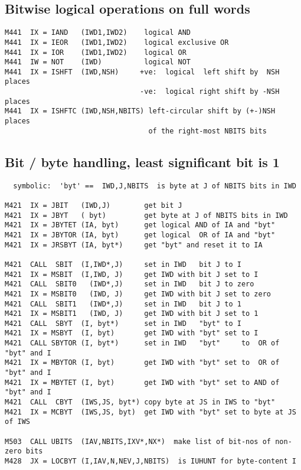 \subsection*{Bitwise logical operations on full words}

\begin{verbatim}
M441  IX = IAND   (IWD1,IWD2)    logical AND
M441  IX = IEOR   (IWD1,IWD2)    logical exclusive OR
M441  IX = IOR    (IWD1,IWD2)    logical OR
M441  IW = NOT    (IWD)          logical NOT
M441  IX = ISHFT  (IWD,NSH)     +ve:  logical  left shift by  NSH places
                                -ve:  logical right shift by -NSH places
M441  IX = ISHFTC (IWD,NSH,NBITS) left-circular shift by (+-)NSH places
                                  of the right-most NBITS bits
\end{verbatim}

\subsection*{Bit / byte handling, least significant bit is 1}

\begin{verbatim}
  symbolic:  'byt' ==  IWD,J,NBITS  is byte at J of NBITS bits in IWD

M421  IX = JBIT   (IWD,J)        get bit J
M421  IX = JBYT   ( byt)         get byte at J of NBITS bits in IWD
M421  IX = JBYTET (IA, byt)      get logical AND of IA and "byt"
M421  IX = JBYTOR (IA, byt)      get logical  OR of IA and "byt"
M421  IX = JRSBYT (IA, byt*)     get "byt" and reset it to IA

M421  CALL  SBIT  (I,IWD*,J)     set in IWD   bit J to I
M421  IX = MSBIT  (I,IWD, J)     get IWD with bit J set to I
M421  CALL  SBIT0   (IWD*,J)     set in IWD   bit J to zero
M421  IX = MSBIT0   (IWD, J)     get IWD with bit J set to zero
M421  CALL  SBIT1   (IWD*,J)     set in IWD   bit J to 1
M421  IX = MSBIT1   (IWD, J)     get IWD with bit J set to 1
M421  CALL  SBYT  (I, byt*)      set in IWD   "byt" to I
M421  IX = MSBYT  (I, byt)       get IWD with "byt" set to I
M421  CALL SBYTOR (I, byt*)      set in IWD   "byt"     to  OR of "byt" and I
M421  IX = MBYTOR (I, byt)       get IWD with "byt" set to  OR of "byt" and I
M421  IX = MBYTET (I, byt)       get IWD with "byt" set to AND of "byt" and I
M421  CALL  CBYT  (IWS,JS, byt*) copy byte at JS in IWS to "byt"
M421  IX = MCBYT  (IWS,JS, byt)  get IWD with "byt" set to byte at JS of IWS

M503  CALL UBITS  (IAV,NBITS,IXV*,NX*)  make list of bit-nos of non-zero bits
M428  JX = LOCBYT (I,IAV,N,NEV,J,NBITS)  is IUHUNT for byte-content I
\end{verbatim}

